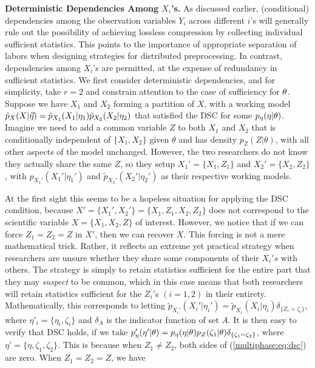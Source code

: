 \medskip
\noindent
{\bf Deterministic Dependencies Among $X_i$'s.}
As discussed earlier, (conditional) dependencies among the observation variables $Y_i$ across different $i$'s will generally rule out the possibility of achieving lossless compression by collecting individual sufficient statistics. This points to the importance of appropriate separation of labors when designing strategies for distributed preprocessing.
In contrast,  dependencies among $X_i$'s are  permitted, at the expense of redundancy in sufficient statistics.    
We first consider deterministic dependencies, and for simplicity, take $r = 2$ and constrain attention to the case of sufficiency for $\theta$.
 Suppose we have $X_1$ and $X_2$ forming a partition of   $X$, with a working model $\tilde{p}_X(X | \vec {\eta})=\tilde p_{X_1}(X_1 |\eta_1)\tilde p_{X_2}(X_2 |\eta_2) $ that satisfied the DSC for some $p_\eta(\eta | \theta)$.
 Imagine we need to add a common variable $Z$ to both $X_1$ and $X_2$ that is conditionally independent of $\{X_1, X_2\}$ given $\theta$ and has density $p_Z(Z|\theta)$, with all other aspects of the model unchanged.
However, the two researchers do not know they actually share the same $Z$, so they setup $X_1'=\{X_1, Z_1\}$ and $X_2'=\{X_2, Z_2\}$, with $p_{X_1'}(X_1' |\eta_1')$ and $\tilde p_{X_2'}(X_2' |\eta_2')$ as their respective working models.

At the first sight this seems to be a hopeless  situation for applying the DSC condition, because $X'=\{X_1', X_2'\}=\{X_1, Z_1, X_2, Z_2\}$ does not correspond to the scientific variable $X=\{X_1, X_2, Z\}$ of interest.
However, we notice that if we can force $Z_1=Z_2=Z$ in $X'$, then we can recover $X$.
This forcing is not a mere mathematical trick.
Rather, it reflects an extreme yet practical strategy when researchers are unsure whether they share some components of their $X_i's$ with others.
The strategy is simply to retain statistics sufficient for the entire part that they may \textit{suspect} to be common, which in this case means that both researchers will retain statistics sufficient for the $Z_i'$s $(i=1,2)$ in their entirety.
Mathematically, this corresponds to letting $\tilde p_{X_i'}(X_i' |\eta_i')= \tilde p_{X_i}(X_i |\eta_i)\delta_{\{Z_i=\zeta_i\}}$, where $\eta'_i=\{\eta_i,\zeta_i\}$ and $\delta_A$ is the indicator function of set $A$.
 It is then easy to verify that DSC holds, if we take 
$p_\eta'(\eta' | \theta)=p_\eta(\eta | \theta)p_{Z}(\zeta_1|\theta)\delta_{\{\zeta_1=\zeta_2\}}$, where $\eta'=\{\eta, \zeta_1, \zeta_2\}.$ This is because when $Z_1\not= Z_2$,  both sides of (\ref{multiphase:eq:dsc}) are zero. When $Z_1=Z_2=Z$, we have 

